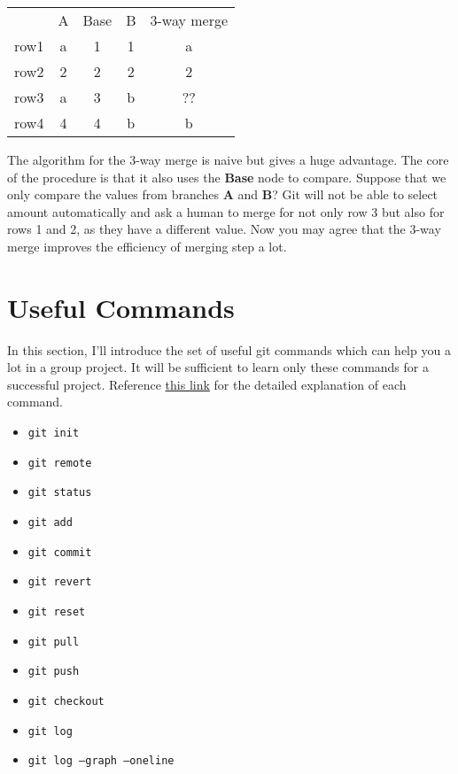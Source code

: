 \documentclass{oblivoir}
\begin{document}
\begin{center}
\begin{tabular}{c | c | c |c | c}
     & A & Base & B  & 3-way merge\\
row1 & a & 1    & 1  &     a\\
row2 & 2 & 2    & 2  & 2\\
row3 & a & 3    & b  & ??\\
row4 & 4 & 4    & b  & b
\end{tabular}
\end{center}

The algorithm for the 3-way merge is naive but gives a huge advantage. The core of the procedure is that it also uses the \textbf{Base} node to compare. Suppose that we only compare the values from branches \textbf{A} and \textbf{B}?  Git will not be able to select amount automatically and ask a human to merge for not only row 3 but also for rows 1 and 2, as they have a different value. Now you may agree that the 3-way merge improves the efficiency of merging step a lot. 


\section{Useful Commands}

In this section, I'll introduce the set of useful git commands which can help you a lot in a group project. It will be sufficient to learn only these commands for a successful project. Reference \href{ https://confluence.atlassian.com/bitbucketserver/basic-git-commands-776639767.html}{this link} for the detailed explanation of each command.
\begin{itemize}
    \item \texttt{git init}
    \item \texttt{git remote}
    \item \texttt{git status}
    \item \texttt{git add}
    \item \texttt{git commit}
    \item \texttt{git revert}
    \item \texttt{git reset}
    \item \texttt{git pull}
    \item \texttt{git push}
    \item \texttt{git checkout}
    \item \texttt{git log}
    \item \texttt{git log --graph --oneline} 
\end{itemize}
\end{document}
